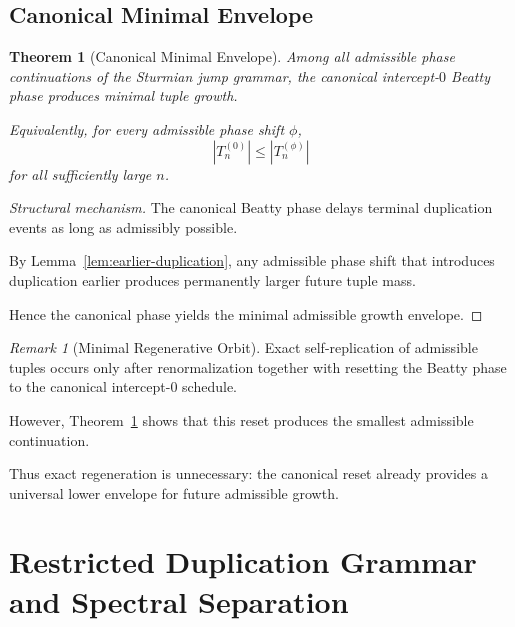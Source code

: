 \documentclass[12pt, oneside]{article}
\numberwithin{equation}{section}
\theoremstyle{definition}
\theoremstyle{plain}
\newtheorem{theorem}{Theorem}[section]
\theoremstyle{remark}
\newtheorem*{remark}{Remark}
\begin{document}

\subsection{Canonical Minimal Envelope}


\begin{theorem}[Canonical Minimal Envelope]
\label{thm:minimal-envelope}
Among all admissible phase continuations of the Sturmian jump grammar,
the canonical intercept-$0$ Beatty phase produces minimal tuple growth.

Equivalently, for every admissible phase shift $\phi$,
\[
|T_n^{(0)}|
\le
|T_n^{(\phi)}|
\]
for all sufficiently large $n$.
\end{theorem}

\begin{proof}[Structural mechanism]
The canonical Beatty phase delays terminal duplication events
as long as admissibly possible.

By Lemma~\ref{lem:earlier-duplication}, any admissible phase shift
that introduces duplication earlier produces permanently larger
future tuple mass.

Hence the canonical phase yields the minimal admissible growth
envelope.
\end{proof}


\begin{remark}[Minimal Regenerative Orbit]
Exact self-replication of admissible tuples occurs only after
renormalization together with resetting the Beatty phase to the
canonical intercept-$0$ schedule.

However, Theorem~\ref{thm:minimal-envelope} shows that this reset
produces the smallest admissible continuation.

Thus exact regeneration is unnecessary:
the canonical reset already provides a universal lower envelope for
future admissible growth.
\end{remark}

\section{Restricted Duplication Grammar and Spectral Separation}
\label{sec:restricted-grammar}
\end{document}
